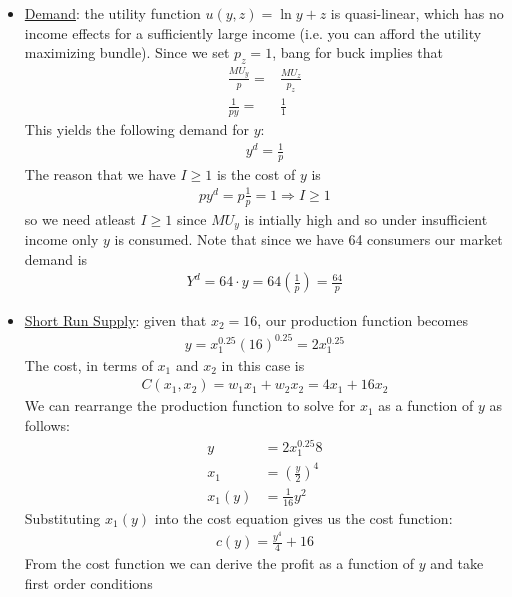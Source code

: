 \documentclass{article}
\begin{document}
  \begin{itemize}
    \item  \underline{Demand}: the utility function $u(y,z) = \ln y + z$ is quasi-linear, which has no income effects for a sufficiently large income (i.e. you can afford the utility maximizing bundle). Since we set $p_{z} = 1$, bang for buck implies that
    \begin{align*}
      \frac{MU_{y}}{p} =& \frac{MU_{z}}{p_{z}} \\
      \frac{1}{py} =& \frac{1}{1}
    \end{align*}
    This yields the following demand for $y$:
    \begin{gather*}
      y^{d} = \frac{1}{p}
    \end{gather*}
    The reason that we have $I \geq 1$ is the cost of $y$ is
    \begin{gather*}
      py^{d} = p \frac{1}{p} = 1 \Rightarrow I \geq 1
    \end{gather*}
    so we need atleast $I \geq 1$ since $MU_{y}$ is intially high and so under insufficient income only $y$ is consumed. Note that since we have 64 consumers our market demand is
    \begin{gather*}
      Y^{d} = 64 \cdot y = 64 (\frac{1}{p}) = \frac{64}{p}
    \end{gather*}
    \item  \underline{Short Run Supply}: given that $x_{2} = 16$, our production function becomes
    \begin{gather*}
      y = x_{1}^{0.25}(16)^{0.25} = 2x_{1}^{0.25}
    \end{gather*}
    The cost, in terms of $x_{1}$ and $x_{2}$ in this case is
    \begin{gather*}
      C(x_{1}, x_{2}) = w_{1}x_{1} + w_{2}x_{2} =  4x_{1} + 16x_{2}
    \end{gather*}
    We can rearrange the production function to solve for $x_{1}$ as a function of $y$ as follows:
    \begin{align*}
      y &= 2x_{1}^{0.25}8 \\
      x_{1} &= (\frac{y}{2})^{4} \\
      x_{1}(y) &= \frac{1}{16}y^{2}
    \end{align*}
    Substituting $x_{1}(y)$ into the cost equation gives us the cost function:
    \begin{gather*}
      c(y) = \frac{y^{4}}{4} + 16
    \end{gather*}
    From the cost function we can derive the profit as a function of $y$ and take first order conditions

\end{itemize}
\end{document}
